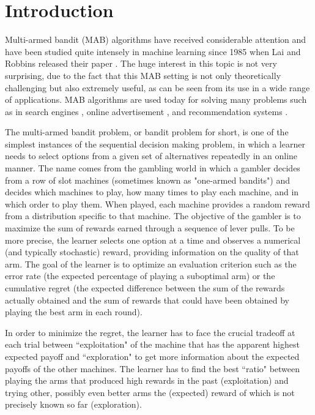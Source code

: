 \documentclass[MSc,beforeExam]{iitcsthesis}
\begin{document}
\chapter{Introduction}

	Multi-armed bandit (MAB) algorithms have received considerable attention and have been studied quite intensely in machine learning since 1985 when Lai and Robbins released their paper \cite{lai1985asymptotically}. 
	The huge interest in this topic is not very surprising, due to the fact that this MAB setting is not only theoretically challenging but also extremely useful, as can be seen from its use in a wide range of applications. MAB algorithms are used today for solving many problems such as in search engines \cite{radlinski2008learning, agrawal2009diversifying, hofmann2011contextual, slivkins2010ranked}, online advertisement \cite{rusmevichientong2006adaptive, yuan2013adaptive, chakrabarti2009mortal}, and recommendation systems \cite{li2010contextual, li2011unbiased}.

	The multi-armed bandit problem, or bandit problem for short, is one of the simplest instances of the sequential decision making problem, in which a learner needs to select options from a given set of alternatives repeatedly in an online manner. The name comes from the gambling world in which a gambler decides from a row of slot machines (sometimes known as "one-armed bandits") and decides which machines to play, how many times to play each machine, and in which order to play them. When played, each machine provides a random reward from a distribution specific to that machine.
	The objective of the gambler is to maximize the sum of rewards earned through a sequence of lever pulls. 
	To be more precise, the learner selects one option at a time and observes a numerical (and typically stochastic) reward, providing information on the quality of that arm. The goal of the learner is to optimize an evaluation criterion such as the error rate (the expected percentage of playing a suboptimal arm) or the cumulative regret (the expected difference between the sum of the rewards actually obtained and the sum of rewards that could have been obtained by playing the best arm in each round).

	In order to minimize the regret, the learner has to face the crucial tradeoff at each trial between ``exploitation" of the machine that has the apparent highest expected payoff and ``exploration" to get more information about the expected payoffs of the other machines. 
	The learner has to find the best ``ratio" between playing the arms that produced high rewards in the past (exploitation) and trying other, possibly even better arms the (expected) reward of which is not precisely known so far (exploration).
\end{document}
